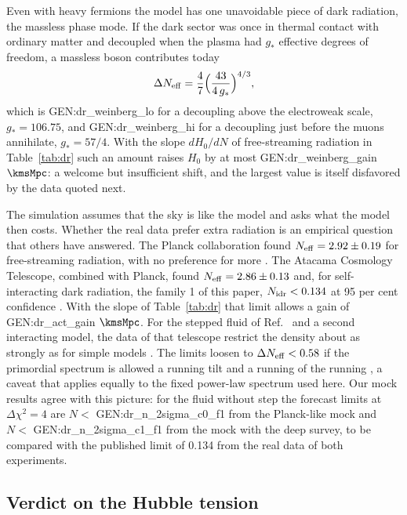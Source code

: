 Even with heavy fermions the model has one unavoidable piece of dark radiation, the massless phase
mode. If the dark sector was once in thermal contact with ordinary matter and decoupled when the
plasma had $g_*$ effective degrees of freedom, a massless boson contributes today
\cite{Weinberg2013}
\begin{equation}
\Delta N_{\rm eff}=\frac47\Big(\frac{43}{4\,g_*}\Big)^{4/3},
\label{eq:weinberg}
\end{equation}
which is {{GEN:dr_weinberg_lo}} for a decoupling above the electroweak scale, $g_*=106.75$, and
{{GEN:dr_weinberg_hi}} for a decoupling just before the muons annihilate, $g_*=57/4$. With the slope
$dH_0/dN$ of free-streaming radiation in Table~\ref{tab:dr} such an amount raises $H_0$ by at most
{{GEN:dr_weinberg_gain}} $\kmsMpc$: a welcome but insufficient shift, and the largest value is itself
disfavored by the data quoted next.

The simulation assumes that the sky is like the \LCDM{} model and asks what the model then costs.
Whether the real data prefer extra radiation is an empirical question that others have answered. The
Planck collaboration found $N_{\rm eff}=2.92\pm0.19$ for free-streaming radiation, with no preference
for more \cite{Planck2018VI}. The Atacama Cosmology Telescope, combined with Planck, found
$N_{\rm eff}=2.86\pm0.13$ and, for self-interacting dark radiation, the family 1 of this paper,
$N_{\rm idr}<0.134$ at 95 per cent confidence \cite{Calabrese2025}. With the slope of
Table~\ref{tab:dr} that limit allows a gain of {{GEN:dr_act_gain}} $\kmsMpc$. For the stepped fluid of
Ref.~\cite{Aloni2022} and a second interacting model, the data of that telescope restrict the density
about as strongly as for simple models \cite{CvetkoJosephMarquesTavares2025}. The limits loosen to
$\Delta N_{\rm eff}<0.58$ if the primordial spectrum is allowed a running tilt and a running of the
running \cite{GarnyNiedermannSloth2026}, a caveat that applies equally to the fixed power-law
spectrum used here. Our mock results agree with this picture: for the fluid without step the forecast
limits at $\Delta\chi^2=4$ are $N<$ {{GEN:dr_n_2sigma_c0_f1}} from the Planck-like mock and $N<$
{{GEN:dr_n_2sigma_c1_f1}} from the mock with the deep survey, to be compared with the published
limit of 0.134 from the real data of both experiments.

\subsection{Verdict on the Hubble tension}

